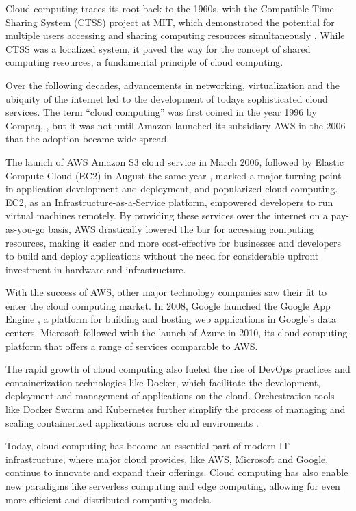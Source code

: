 \documentclass[
  table]{report}
\begin{document}
Cloud computing traces its root back to the 1960s, with the Compatible
Time-Sharing System (CTSS) project at MIT, which demonstrated the
potential for multiple users accessing and sharing computing resources
simultaneously \citep{crisman1963}. While CTSS was a localized system,
it paved the way for the concept of shared computing resources, a
fundamental principle of cloud computing.

Over the following decades, advancements in networking, virtualization
and the ubiquity of the internet led to the development of todays
sophisticated cloud services. The term ``cloud computing'' was first
coined in the year 1996 by Compaq,
\citep{favaloroInternetSolutionsDivision1996}, but it was not until
Amazon launched its subsidiary \ac{AWS} in the 2006 that the adoption
became wide spread.

The launch of \ac{AWS} Amazon S3 cloud service in March 2006, followed
by Elastic Compute Cloud (EC2) in August the same year
\citep{barrAmazonEC2Beta2006}, marked a major turning point in
application development and deployment, and popularized cloud computing.
EC2, as an Infrastructure-as-a-Service platform, empowered developers to
run virtual machines remotely. By providing these services over the
internet on a pay-as-you-go basis, \ac{AWS} drastically lowered the bar
for accessing computing resources, making it easier and more
cost-effective for businesses and developers to build and deploy
applications without the need for considerable upfront investment in
hardware and infrastructure.

With the success of \ac{AWS}, other major technology companies saw their
fit to enter the cloud computing market. In 2008, Google launched the
Google App Engine \citep{mcdonaldIntroducingGoogleApp2008}, a platform
for building and hosting web applications in Google's data centers.
Microsoft followed with the launch of Azure in 2010, its cloud computing
platform that offers a range of services comparable to \ac{AWS}.

The rapid growth of cloud computing also fueled the rise of DevOps
practices and containerization technologies like Docker, which
facilitate the development, deployment and management of applications on
the cloud. Orchestration tools like Docker Swarm and Kubernetes further
simplify the process of managing and scaling containerized applications
across cloud enviroments \citep{bernsteinContainersCloudLXC2014}.

Today, cloud computing has become an essential part of modern IT
infrastructure, where major cloud provides, like \ac{AWS}, Microsoft and
Google, continue to innovate and expand their offerings. Cloud computing
has also enable new paradigms like serverless computing and edge
computing, allowing for even more efficient and distributed computing
models. \citep{baldiniServerlessComputingCurrent2017}
\end{document}

